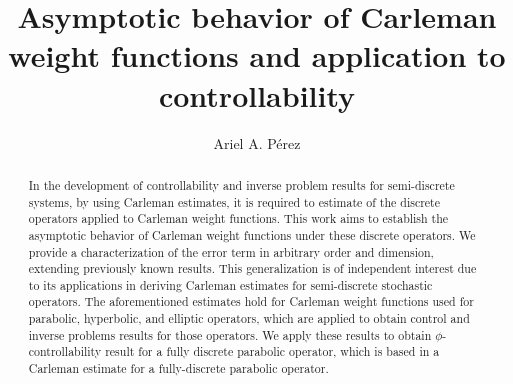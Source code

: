 \documentclass[11pt,oneside,leqno]{amsart}
\numberwithin{equation}{section}
\numberwithin{equation}{section}
\begin{document}
\title[Asymptotic behavior of Carleman weight functions]{Asymptotic behavior of Carleman weight functions and application to controllability}
\author{Ariel A. P\'erez}
\address{Departmento de Matem\'atica, Universidad del B\'io-B\'io, Avda. Collao 1202, Concepci\'on, Chile}
\begin{abstract}
 In the development of controllability and inverse problem results for semi-discrete systems, by using Carleman estimates, it is required to estimate of the discrete operators applied to Carleman weight functions. This work aims to establish the asymptotic behavior of Carleman weight functions under these discrete operators. We provide a characterization of the error term in arbitrary order and dimension, extending previously known results. This generalization is of independent interest due to its applications in deriving Carleman estimates for semi-discrete stochastic operators. The aforementioned estimates hold for Carleman weight functions used for parabolic, hyperbolic, and elliptic operators, which are applied to obtain control and inverse problems results for those operators. We apply these results to obtain $\phi$-controllability result for a fully discrete parabolic operator, which is based in a Carleman estimate for a fully-discrete parabolic operator. 
\end{abstract}
\maketitle
\end{document}
